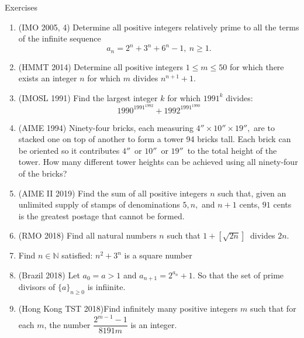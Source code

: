 \begin{xcb}{Exercises}
\begin{enumerate}
\item (IMO 2005, 4) Determine all positive integers relatively prime to all the terms of the infinite sequence\[a_n=2^n+3^n+6^n -1,\ n\geq 1.\]
\item (HMMT 2014) Determine all positive integers $1 \leq m \leq 50$ for which there exists an integer $n$ for which $m$ divides $n^{n+1} + 1$.
\item (IMOSL 1991) Find the largest integer $k$ for which $1991^k$ divides:\\
\[1990^{1991^{1992}}+1992^{1991^{1990}}\]
\item (AIME 1994) Ninety-four bricks, each measuring $4''\times10''\times19'',$ are to stacked one on top of another to form a tower 94 bricks tall. Each brick can be oriented so it contributes $4''\,$ or $10''\,$ or $19''\,$ to the total height of the tower. How many different tower heights can be achieved using all ninety-four of the bricks?\\
\item (AIME II 2019) Find the sum of all positive integers $n$ such that, given an unlimited supply of stamps of denominations $5,n,$ and $n+1$ cents, $91$ cents is the greatest postage that cannot be formed.\\
\item (RMO 2018) Find all natural numbers $n$ such that $1+[\sqrt{2n}]~$ divides $2n$.
\item Find $n\in \mathbb{N}$ satisfied: $n^2+3^n$ is a square number
\item (Brazil 2018) Let $a_0=a>1$ and $a_{n+1}=2^{a_n}+1$. So that the set of prime divisors of $\{a\}_{n\geq 0}$ is infiinite.
\item (Hong Kong TST 2018)Find infinitely many positive integers $m$ such that for each $m$, the number $\dfrac{2^{m-1}-1}{8191m}$ is an integer.
\end{enumerate}
\end{xcb}